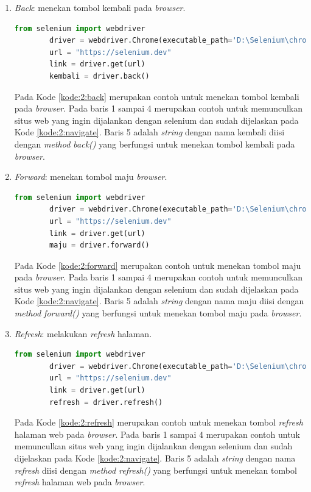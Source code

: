 \begin{enumerate}
	\item \textit{Back}: menekan tombol kembali pada \textit{browser}.
	\begin{lstlisting}[language=python, caption=Contoh kode Back, label=kode:2:back]
		from selenium import webdriver
		driver = webdriver.Chrome(executable_path='D:\Selenium\chromedriver.exe')
		url = "https://selenium.dev"
		link = driver.get(url)
		kembali = driver.back()
	\end{lstlisting}
	Pada Kode \ref{kode:2:back} merupakan contoh untuk menekan tombol kembali pada \textit{browser}. Pada baris 1 sampai 4 merupakan contoh untuk memunculkan situs web yang ingin dijalankan dengan selenium dan sudah dijelaskan pada Kode \ref{kode:2:navigate}. Baris 5 adalah \textit{string} dengan nama kembali diisi dengan \textit{method back()} yang berfungsi untuk menekan tombol kembali pada \textit{browser}.\\
	\item \textit{Forward}: menekan tombol maju \textit{browser}.
	\begin{lstlisting}[language=python, caption=Contoh kode Forward, label=kode:2:forward]
		from selenium import webdriver
		driver = webdriver.Chrome(executable_path='D:\Selenium\chromedriver.exe')
		url = "https://selenium.dev"
		link = driver.get(url)
		maju = driver.forward()
	\end{lstlisting}
	Pada Kode \ref{kode:2:forward} merupakan contoh untuk menekan tombol maju pada \textit{browser}. Pada baris 1 sampai 4 merupakan contoh untuk memunculkan situs web yang ingin dijalankan dengan selenium dan sudah dijelaskan pada Kode \ref{kode:2:navigate}. Baris 5 adalah \textit{string} dengan nama maju diisi dengan \textit{method forward()} yang berfungsi untuk menekan tombol maju pada \textit{browser}.\\
	\item \textit{Refresh}: melakukan \textit{refresh} halaman.
	\begin{lstlisting}[language=python, caption=Contoh kode Refresh, label=kode:2:refresh]
		from selenium import webdriver
		driver = webdriver.Chrome(executable_path='D:\Selenium\chromedriver.exe')
		url = "https://selenium.dev"
		link = driver.get(url)
		refresh = driver.refresh()
	\end{lstlisting}
	Pada Kode \ref{kode:2:refresh} merupakan contoh untuk menekan tombol \textit{refresh} halaman web pada \textit{browser}. Pada baris 1 sampai 4 merupakan contoh untuk memunculkan situs web yang ingin dijalankan dengan selenium dan sudah dijelaskan pada Kode \ref{kode:2:navigate}. Baris 5 adalah \textit{string} dengan nama \textit{refresh} diisi dengan \textit{method refresh()} yang berfungsi untuk menekan tombol \textit{refresh} halaman web pada \textit{browser}.\\

\end{enumerate}
